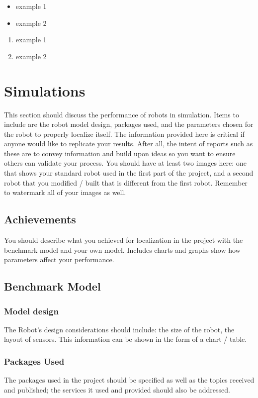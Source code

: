 \documentclass[10pt,journal,compsoc]{IEEEtran}
\begin{document}
\begin{itemize}
\item example 1
\item example 2
\end {itemize}

\begin{enumerate}
\item example 1
\item example 2
\end{enumerate}

\section{Simulations}
This section should discuss the performance of robots in simulation. Items to include are the robot model design, packages used, and the parameters chosen for the robot to properly localize itself. The information provided here is critical if anyone would like to replicate your results. After all, the intent of reports such as these are to convey information and build upon ideas so you want to ensure others can validate your process.
You should have at least two images here: one that shows your standard robot used in the first part of the project, and a second robot that you modified / built that is different from the first robot. Remember to watermark all of your images as well.

\subsection{Achievements}
You should describe what you achieved for localization in the project with the benchmark model and your own model. Includes charts and graphs show how parameters affect your performance.

\subsection{Benchmark Model}
\subsubsection{Model design}
The Robot's design considerations should include: the size of the robot, the layout of sensors. This information can be shown in the form of a chart / table.

\subsubsection{Packages Used}
The packages used in the project should be specified as well as the topics received and published; the services it used and provided should also be addressed.
\end{document}
